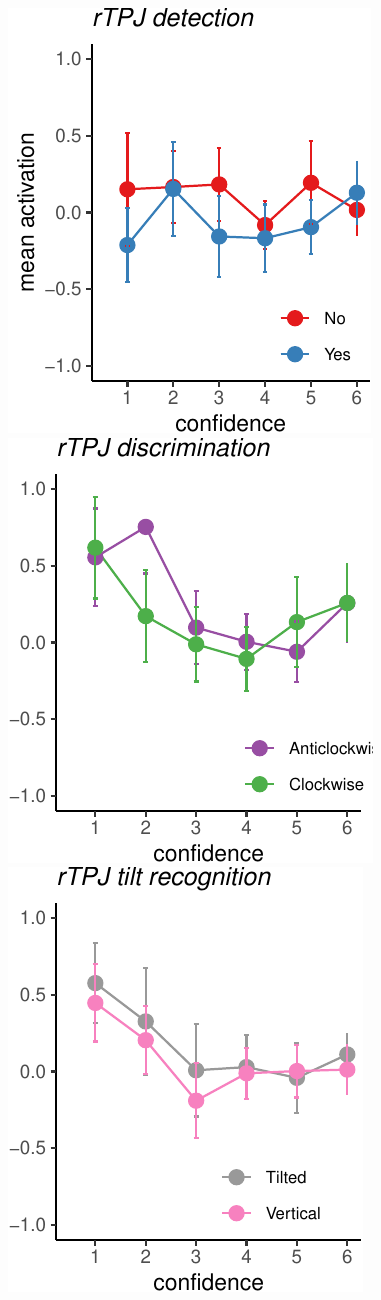 \documentclass[]{article}
\begin{document}
\includegraphics{Chudi-Thesis_files/figure-latex/unnamed-chunk-7-1.pdf}
\includegraphics{Chudi-Thesis_files/figure-latex/unnamed-chunk-7-2.pdf}
\includegraphics{Chudi-Thesis_files/figure-latex/unnamed-chunk-7-3.pdf}
~
\end{document}
